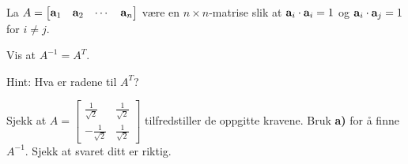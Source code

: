 \begin{oppgave}
La $A=\begin{bmatrix}
\mathbf{a}_1 & \mathbf{a}_2 & \cdots & \mathbf{a}_n
\end{bmatrix}
$ være en $n\times n$-matrise slik at $\mathbf{a}_i\cdot \mathbf{a}_i=1$ og $\mathbf{a}_i\cdot \mathbf{a}_j=1$ for $i\neq j$.

\begin{punkt}
Vis at $A^{-1}=A^T$.

Hint: Hva er radene til $A^T$?
\end{punkt}

\begin{punkt}
Sjekk at $A=\begin{bmatrix}
\frac{1}{\sqrt{2}} & \frac{1}{\sqrt{2}}\\
-\frac{1}{\sqrt{2}} & \frac{1}{\sqrt{2}}
\end{bmatrix}$
tilfredstiller de oppgitte kravene. Bruk \textbf{a)} for å finne $A^{-1}$. Sjekk at svaret ditt er riktig.
\end{punkt}

\end{oppgave}


